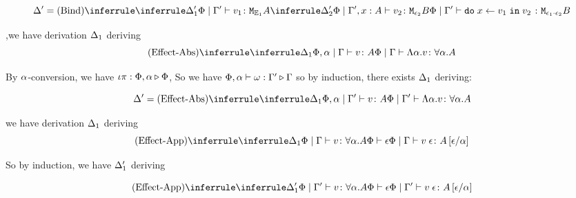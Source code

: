 {    \begin{equation}
        \D' = \ntreeruleII{Bind}{
            \treeruleI{\D_1'}{\etyperelation{\P}{\G'}{v_1}{\M{\E_1}{A}}}
            }{
            \treeruleI{\D_2'}{\etyperelation{\P}{\G',x: A}{v_2}{\M{\e_2}{B}}}
        }{
            \etyperelation{\P}{\G'}{\doin{x}{v_1}{v_2}}{\M{\e_1\dot\e_2}{B}}
        }
    \end{equation}

        \bi,we have derivation $\Delta_1$ deriving
        \begin{equation}
            \ntreeruleI{Effect-Abs}{
                    \treeruleI{\D_1}{\etyperelation{\P,\a}{\G}{v}{A}}}{\gpetyperelation{\elam{\a}{v}}{\all{\a}{A}}
                    }
        \end{equation}
        
        By $\alpha$-conversion, we have $\iota\pi : \Phi,\alpha \triangleright \Phi$,
        So we have $\Phi,\alpha\vdash \omega : \Gamma' \triangleright \Gamma$ so by induction, there exists $\Delta_1$ deriving:

        \begin{equation}
            \D' = 
            \ntreeruleI{Effect-Abs}{
                \treeruleI{\D_1}{\etyperelation{\P,\a}{\G'}{v}{A}}
            }{
                \etyperelation{
                    \P
                }{
                    \G'
                }{
                    \elam{\a}{v}
                }{\all{\a}{A}}
            }
        \end{equation}

    \bi we have derivation $\Delta_1$ deriving
    \begin{equation}
        \ntreeruleII{Effect-App}{
            \treeruleI{\D_1}{\gpetyperelation{v}{\all{\a}{A}}}
            }{
           \wellformed{\P}{\e}
        }{
            \gpetyperelation{\eapp{v}{\e}}{A\ssub{\a}{\e}}
        }
    \end{equation}

    So by induction, we have $\Delta_1'$ deriving

    \begin{equation}
        \ntreeruleII{Effect-App}{
            \treeruleI{\D_1'}{\etyperelation{\P}{\G'}{v}{\all{\a}{A}}}
            }{
           \wellformed{\P}{\e}
        }{
            \etyperelation{\P}{\G'}{\eapp{v}{\e}}{A\ssub{\a}{\e}}
        }
    \end{equation}
}

\ifdefined\NoDocument
\else
\documentclass{report}


   \Weakening

\fi